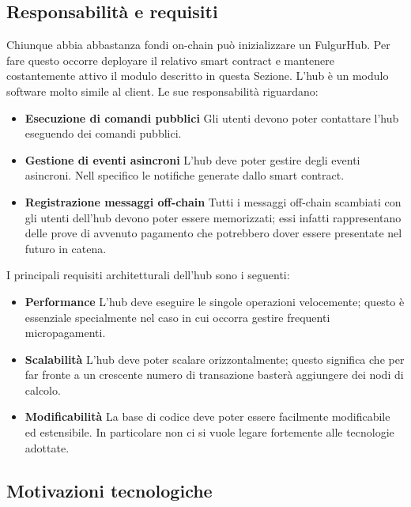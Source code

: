 \documentclass[12pt,italian,]{book}
\providecommand{\tightlist}{%
  \setlength{\itemsep}{0pt}\setlength{\parskip}{0pt}}
\begin{document}
\hypertarget{responsabilituxe0-e-requisiti-1}{%
\subsection{Responsabilità e requisiti}\label{responsabilituxe0-e-requisiti-1}}

Chiunque abbia abbastanza fondi on-chain può inizializzare un FulgurHub. Per fare questo occorre deployare il relativo smart contract e mantenere costantemente attivo il modulo descritto in questa Sezione. L'hub è un modulo software molto simile al client. Le sue responsabilità riguardano:

\begin{itemize}
\tightlist
\item
  \textbf{\textbf{Esecuzione di comandi pubblici}} Gli utenti devono poter contattare l'hub eseguendo dei comandi pubblici.
\item
  \textbf{\textbf{Gestione di eventi asincroni}} L'hub deve poter gestire degli eventi asincroni. Nell specifico le notifiche generate dallo smart contract.
\item
  \textbf{\textbf{Registrazione messaggi off-chain}} Tutti i messaggi off-chain scambiati con gli utenti dell'hub devono poter essere memorizzati; essi infatti rappresentano delle prove di avvenuto pagamento che potrebbero dover essere presentate nel futuro in catena.
\end{itemize}

I principali requisiti architetturali dell'hub sono i seguenti:

\begin{itemize}
\tightlist
\item
  \textbf{\textbf{Performance}} L'hub deve eseguire le singole operazioni velocemente; questo è essenziale specialmente nel caso in cui occorra gestire frequenti micropagamenti.
\item
  \textbf{\textbf{Scalabilità}} L'hub deve poter scalare orizzontalmente; questo significa che per far fronte a un crescente numero di transazione basterà aggiungere dei nodi di calcolo.
\item
  \textbf{\textbf{Modificabilità}} La base di codice deve poter essere facilmente modificabile ed estensibile. In particolare non ci si vuole legare fortemente alle tecnologie adottate.
\end{itemize}

\hypertarget{motivazioni-tecnologiche-2}{%
\subsection{Motivazioni tecnologiche}\label{motivazioni-tecnologiche-2}}
\end{document}
